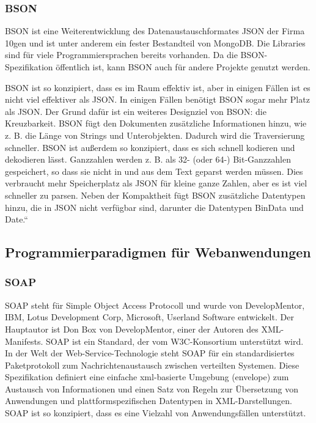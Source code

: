 \subsubsection{BSON}

BSON ist eine Weiterentwicklung des Datenaustauschformates JSON der Firma 10gen und ist unter anderem ein fester Bestandteil von MongoDB. Die Libraries sind für viele Programmiersprachen bereits vorhanden. Da die BSON-Spezifikation öffentlich ist, kann BSON auch für andere Projekte genutzt werden.\cite{thKloeln}

BSON ist so konzipiert, dass es im Raum effektiv ist, aber in einigen Fällen ist es nicht viel effektiver als JSON. In einigen Fällen benötigt BSON sogar mehr Platz als JSON. Der Grund dafür ist ein weiteres Designziel von BSON: die Kreuzbarkeit. BSON fügt den Dokumenten zusätzliche Informationen hinzu, wie z. B. die Länge von Strings und Unterobjekten. Dadurch wird die Traversierung schneller.\cite{bson} BSON ist außerdem so konzipiert, dass es sich schnell kodieren und dekodieren lässt. Ganzzahlen werden z. B. als 32- (oder 64-) Bit-Ganzzahlen gespeichert, so dass sie nicht in und aus dem Text geparst werden müssen. Dies verbraucht mehr Speicherplatz als JSON für kleine ganze Zahlen, aber es ist viel schneller zu parsen. Neben der Kompaktheit fügt BSON zusätzliche Datentypen hinzu, die in JSON nicht verfügbar sind, darunter die Datentypen BinData und Date.“
\subsection{Programmierparadigmen für Webanwendungen}
\subsubsection{SOAP}
SOAP steht für Simple Object Access Protocoll und wurde von DevelopMentor, IBM, Lotus Development Corp, Microsoft, Userland Software entwickelt. Der Hauptautor ist Don Box von DevelopMentor, einer der Autoren des XML-Manifests. SOAP ist ein Standard, der vom W3C-Konsortium unterstützt wird. In der Welt der Web-Service-Technologie steht SOAP für ein standardisiertes Paketprotokoll zum Nachrichtenaustausch zwischen verteilten Systemen. Diese Spezifikation definiert eine einfache xml-basierte Umgebung (envelope) zum Austausch von Informationen und einen Satz von Regeln zur Übersetzung von Anwendungen und plattformspezifischen Datentypen in XML-Darstellungen. SOAP ist so konzipiert, dass es eine Vielzahl von Anwendungsfällen unterstützt.\cite{saop1}

